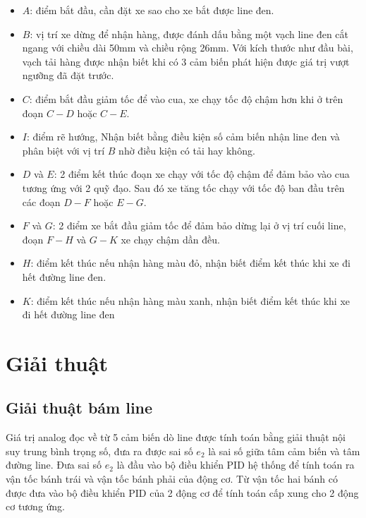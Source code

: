           \begin{itemize}
               \item $A$: điểm bắt đầu, cần đặt xe sao cho xe bắt được line đen.
               \item $B$: vị trí xe dừng để nhận hàng, được đánh dấu bằng một vạch line đen cắt
               ngang với chiều dài 50mm và chiều rộng 26mm. Với kích thước như đầu bài, vạch tải
               hàng được nhận biết khi có 3 cảm biến phát hiện được giá trị vượt ngưỡng đã đặt trước.
               \item $C$: điểm bắt đầu giảm tốc để vào cua, xe chạy tốc độ chậm hơn khi ở trên đoạn $C-D$ hoặc $C-E$.
               \item $I$: điểm rẽ hướng, Nhận biết bằng điều kiện số cảm biến nhận line đen và phân biệt với vị trí $B$ nhờ điều kiện có tải hay không.
               \item $D$ và $E$: 2 điểm kết thúc đoạn xe chạy với tốc độ chậm để đảm bảo vào cua tương ứng với 2 quỹ đạo. Sau đó xe tăng tốc chạy với tốc độ ban đầu trên các đoạn $D-F$ hoặc $E-G$.
               \item $F$ và $G$: 2 điểm xe bắt đầu giảm tốc để đảm bảo dừng lại ở vị trí cuối line, đoạn $F-H$ và $G-K$ xe chạy chậm dần đều.
               \item $H$: điểm kết thúc nếu nhận hàng màu đỏ, nhận biết điểm kết thúc khi xe đi hết đường line đen.
               \item $K$: điểm kết thúc nếu nhận hàng màu xanh, nhận biết điểm kết thúc khi xe đi hết đường line đen
          \end{itemize}
     \section{Giải thuật}
          \subsection{Giải thuật bám line}
               \hspace*{0.6cm}Giá trị analog đọc về từ 5 cảm biến dò line được tính toán bằng giải thuật nội suy
               trung bình trọng số, đưa ra được sai số $e_2$ là sai số giữa tâm cảm biến và tâm đường
               line. Đưa sai số $e_2$ là đầu vào bộ điều khiển PID hệ thống để tính toán ra vận tốc
               bánh trái và vận tốc bánh phải của động cơ. Từ vận tốc hai bánh có được đưa vào bộ
               điều khiển PID của 2 động cơ để tính toán cấp xung cho 2 động cơ tương ứng.
